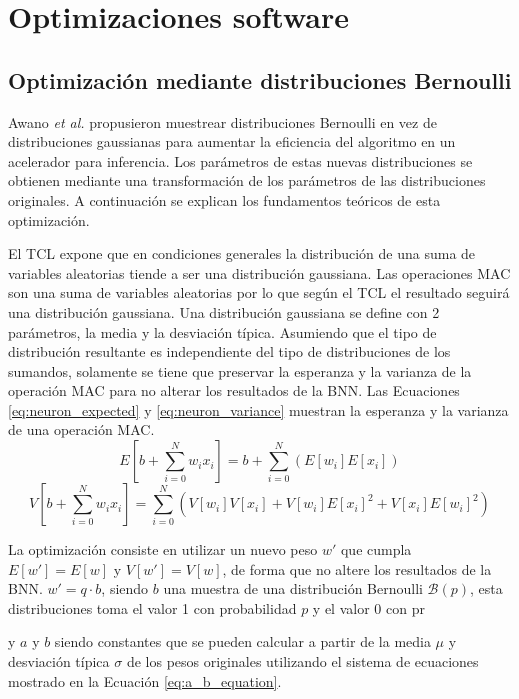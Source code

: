 \chapter{Optimizaciones software}

\section{Optimización mediante distribuciones Bernoulli}

Awano \emph{et al.} \cite{bnn_clt_approx} propusieron muestrear distribuciones Bernoulli en vez de distribuciones gaussianas para aumentar la eficiencia del algoritmo en un acelerador para inferencia. Los parámetros de estas nuevas distribuciones se obtienen mediante una transformación de los parámetros de las distribuciones originales. A continuación se explican los fundamentos teóricos de esta optimización.

El TCL expone que en condiciones generales la distribución de una suma de variables aleatorias tiende a ser una distribución gaussiana. Las operaciones MAC son una suma de variables aleatorias por lo que según el TCL el resultado seguirá una distribución gaussiana. Una distribución gaussiana se define con 2 parámetros, la media y la desviación típica. Asumiendo que el tipo de distribución resultante es independiente del tipo de distribuciones de los sumandos, solamente se tiene que preservar la esperanza y la varianza de la operación MAC para no alterar los resultados de la BNN. Las Ecuaciones \ref{eq:neuron_expected}  y \ref{eq:neuron_variance} muestran la esperanza y la varianza de una operación MAC.
\begin{equation} \label{eq:neuron_expected}
E\left[ b + \sum_{i=0}^N w_i x_i \right]  = b + \sum_{i=0}^N ( E[w_i] E[x_i] )
\end{equation}
\begin{equation} \label{eq:neuron_variance}
V\left[ b + \sum_{i=0}^N w_i x_i \right] = \sum_{i=0}^N ( V[w_i]V[x_i] + V[w_i]E[x_i]^2 + V[x_i]E[w_i]^2 )
\end{equation}

La optimización consiste en utilizar un nuevo peso $w'$ que cumpla $E[w'] = E[w]$ y $V[w'] = V[w]$, de forma que no altere los resultados de la BNN. $w' = q \cdot b$, siendo $b$ una muestra de una distribución Bernoulli $\mathcal{B}(p)$, esta distribuciones toma el valor 1 con probabilidad $p$ y el valor 0 con pr


y $a$ y $b$ siendo constantes que se pueden calcular a partir de la media $\mu$ y desviación típica $\sigma$ de los pesos originales utilizando el sistema de ecuaciones mostrado en la Ecuación \ref{eq:a_b_equation}.

